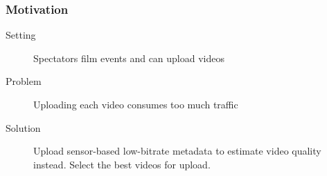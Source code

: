 \begin{frame}
	\frametitle{Motivation}
	\begin{description}
		\item[Setting] Spectators film events and can upload videos
		\item[Problem] Uploading each video consumes too much traffic
		\item[Solution] Upload sensor-based low-bitrate metadata to estimate video quality instead. 
			Select the best videos for upload.
	\end{description}
\end{frame}